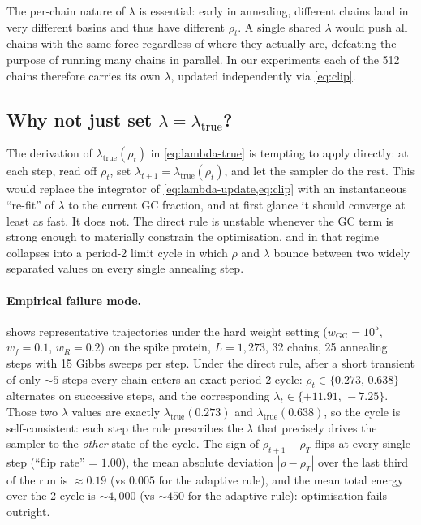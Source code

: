 \documentclass[11pt]{article}
\begin{document}
The per-chain nature of $\lambda$ is essential: early in annealing, different chains land in very different basins and thus have different $\rho_t$.
A single shared $\lambda$ would push all chains with the same force regardless of where they actually are, defeating the purpose of running many chains in parallel.
In our experiments each of the 512 chains therefore carries its own $\lambda$, updated independently via \cref{eq:clip}.

\subsection*{Why not just set $\lambda = \lambda_{\mathrm{true}}$?}\label{sec:gc-osc}

The derivation of $\lambda_{\mathrm{true}}(\rho_t)$ in \cref{eq:lambda-true} is tempting to apply directly: at each step, read off $\rho_t$, set $\lambda_{t+1} = \lambda_{\mathrm{true}}(\rho_t)$, and let the sampler do the rest.
This would replace the integrator of \cref{eq:lambda-update,eq:clip} with an instantaneous ``re-fit'' of $\lambda$ to the current GC fraction, and at first glance it should converge at least as fast.
It does not. The direct rule is unstable whenever the GC term is strong enough to materially constrain the optimisation, and in that regime collapses into a period-2 limit cycle in which $\rho$ and $\lambda$ bounce between two widely separated values on every single annealing step.

\paragraph{Empirical failure mode.}
 shows representative trajectories under the hard weight setting ($w_{\mathrm{GC}} = 10^5$, $w_f = 0.1$, $w_R = 0.2$) on the spike protein, $L = 1{,}273$, 32 chains, 25 annealing steps with 15 Gibbs sweeps per step.
Under the direct rule, after a short transient of only ${\sim}5$ steps every chain enters an exact period-2 cycle:
$\rho_t \in \{0.273,\,0.638\}$ alternates on successive steps, and the corresponding $\lambda_t \in \{+11.91,\,{-}7.25\}$.
Those two $\lambda$ values are exactly $\lambda_{\mathrm{true}}(0.273)$ and $\lambda_{\mathrm{true}}(0.638)$, so the cycle is self-consistent: each step the rule prescribes the $\lambda$ that precisely drives the sampler to the \emph{other} state of the cycle.
The sign of $\rho_{t+1}-\rho_T$ flips at every single step (``flip rate'' = $1.00$), the mean absolute deviation $|\rho - \rho_T|$ over the last third of the run is ${\approx}0.19$ (vs $0.005$ for the adaptive rule), and the mean total energy over the 2-cycle is ${\sim}4{,}000$ (vs ${\sim}450$ for the adaptive rule): optimisation fails outright.
\end{document}

